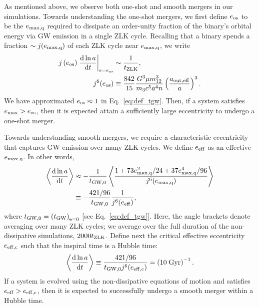 \documentclass[
        fleqn,
        usenatbib,
    ]{mnras}
\newcommand*{\rd}[2]{\frac{\mathrm{d}#1}{\mathrm{d}#2}}
\newcommand*{\at}[1]{\left.#1\right|}
\newcommand*{\ev}[1]{\left\langle#1\right\rangle}
\newcommand*{\p}[1]{\left(#1\right)}
\begin{document}
As mentioned above, we observe both one-shot and smooth mergers in our
simulations. Towards understanding the one-shot mergers, we first define $e_{\rm
os}$ to be the $e_{\rm \max, q}$ required to dissipate an order-unity fraction of
the binary's orbital energy via GW emission in a single ZLK cycle. Recalling
that a binary spends a fraction $\sim j(e_{\rm \max, q})$ of each ZLK cycle near
$e_{\rm \max, q}$, we write
\begin{align}
    j\p{e_{\rm os}}\at{\rd{\ln a}{t}}_{e = e_{\rm os}} &\sim
        \frac{1}{t_{\rm ZLK}},\\
    j^6(e_{\rm os})
        &\equiv \frac{842}{15}
            \frac{G^3 \mu m_{12}^3}{m_3c^5a^4n}
            \p{\frac{a_{\rm out, eff}}{a}}^3.
            \label{eq:def_e_os}
\end{align}
We have approximated $e_{\rm os} \approx 1$ in Eq.~\eqref{eq:def_tgw}. Then, if
a system satisfies $e_{\max} > e_{\rm os}$, then it is expected attain a
sufficiently large eccentricity to undergo a one-shot merger.

Towards understanding smooth mergers, we require a characteristic eccentricity
that captures GW emission over many ZLK cycles. We define $e_{\rm eff}$ as an
effective $e_{\rm \max, q}$. In other words,
\begin{align}
    \ev{\rd{\ln a}{t}} &\approx -\frac{1}{t_{\rm GW, 0}}
            \ev{\frac{1 + 73e_{\rm \max, q}^2/24 + 37e_{\rm \max, q}^4/96}
                {j^6(e_{\rm \max, q})}}\nonumber\\
        &\equiv -\frac{421/96}{t_{\rm GW, 0}}\frac{1}{j^6(e_{\rm eff})},
        \label{eq:def_e_eff}
\end{align}
where $t_{\rm GW, 0} = \p{t_{\rm GW}}_{\rm e = 0}$ [see Eq.~\eqref{eq:def_tgw}].
Here, the angle brackets denote averaging over many ZLK cycles; we average over
the full duration of the non-dissipative simulations, $2000 t_{\rm ZLK}$. Define
next the critical effective eccentricity $e_{\rm eff, c}$ such that the inspiral
time is a Hubble time:
\begin{equation}
    \ev{\rd{\ln a}{t}} \equiv \frac{421/96}{t_{\rm GW, 0}j^6(e_{\rm eff, c})}
        = \p{10\;\mathrm{Gyr}}^{-1}. \label{eq:def_e_eff_c}
\end{equation}
If a system is evolved using the non-dissipative equations of motion and
satisfies $e_{\rm eff} > e_{\rm eff, c}$, then it is expected to successfully
undergo a smooth merger within a Hubble time.
\end{document}
